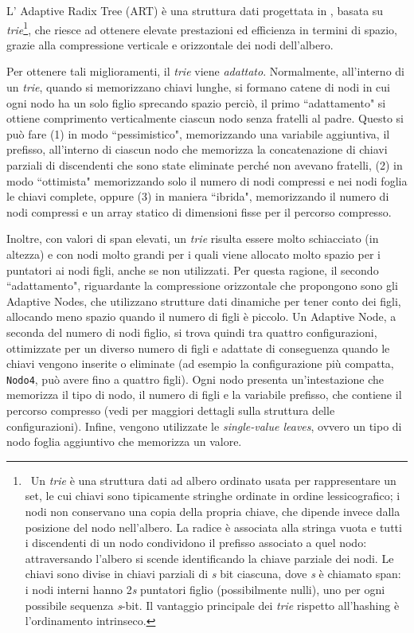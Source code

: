 \documentclass[../main.tex]{subfiles}
\begin{document}
L' Adaptive Radix Tree (ART) è una struttura dati progettata in \cite{leis2013art}, basata su \textit{trie}\footnote{\ Un \textit{trie} è una struttura dati ad albero ordinato usata per rappresentare un set, le cui chiavi sono tipicamente stringhe ordinate in ordine lessicografico; i nodi non conservano una copia della propria chiave, che dipende invece dalla posizione del nodo nell'albero. La radice è associata alla stringa vuota e tutti i discendenti di un nodo condividono il prefisso associato a quel nodo: attraversando l'albero si scende identificando la chiave parziale dei nodi. Le chiavi sono divise in chiavi parziali di \textit{s} bit ciascuna, dove \textit{s} è chiamato span: i nodi interni hanno 2\textit{s} puntatori figlio (possibilmente nulli), uno per ogni possibile sequenza \textit{s}-bit. Il vantaggio principale dei \textit{trie} rispetto all'hashing è l'ordinamento intrinseco.}, che riesce ad ottenere elevate prestazioni ed efficienza in termini di spazio, grazie alla compressione verticale e orizzontale dei nodi dell'albero. 

Per ottenere tali miglioramenti, il \textit{trie} viene \textit{adattato}. Normalmente, all'interno di un \textit{trie}, quando si memorizzano chiavi lunghe, si formano catene di nodi in cui ogni nodo ha un solo figlio sprecando spazio perciò, il primo ``adattamento" si ottiene comprimento verticalmente ciascun nodo senza fratelli al padre. Questo si può fare (1) in modo ``pessimistico", memorizzando una variabile aggiuntiva, il prefisso, all'interno di ciascun nodo che memorizza la concatenazione di chiavi parziali di discendenti che sono state eliminate perché non avevano fratelli, (2) in modo ``ottimista" memorizzando solo il numero di nodi compressi e nei nodi foglia le chiavi complete, oppure (3) in maniera ``ibrida", memorizzando il numero di nodi compressi e un array statico di dimensioni fisse per il percorso compresso.

Inoltre, con valori di span elevati, un \textit{trie} risulta essere molto schiacciato (in altezza) e con nodi molto grandi per i quali viene allocato molto spazio per i puntatori ai nodi figli, anche se non utilizzati. Per questa ragione, il secondo ``adattamento", riguardante la compressione orizzontale che \cite{leis2013art} propongono sono gli Adaptive Nodes, che utilizzano strutture dati dinamiche per tener conto dei figli, allocando meno spazio quando il numero di figli è piccolo. Un Adaptive Node, a seconda del numero di nodi figlio, si trova quindi tra quattro configurazioni, ottimizzate per un diverso numero di figli e adattate di conseguenza quando le chiavi vengono inserite o eliminate (ad esempio la configurazione più compatta, \texttt{Nodo4}, può avere fino a quattro figli). Ogni nodo presenta un'intestazione che memorizza il tipo di nodo, il numero di figli e la variabile prefisso, che contiene il percorso compresso (vedi \cite{leis2013art} per maggiori dettagli sulla struttura delle configurazioni). Infine, vengono utilizzate le  \textit{single-value leaves}, ovvero un tipo di nodo foglia aggiuntivo che memorizza un valore.
\end{document}

